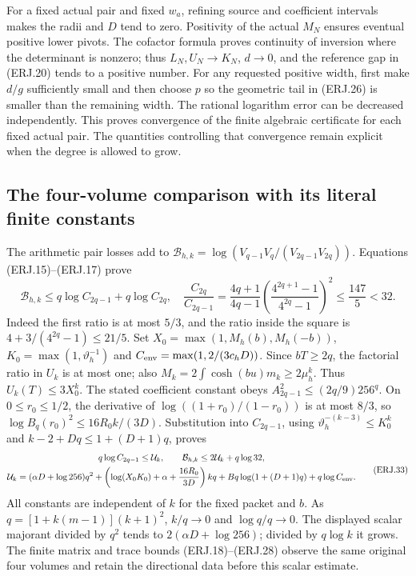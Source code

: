 For a fixed actual pair and fixed $w_a$, refining source and coefficient
intervals makes the radii and $D$ tend to zero. Positivity of the
actual $M_N$ ensures eventual positive lower pivots. The cofactor
formula proves continuity of inversion where the determinant is
nonzero; thus $L_N,U_N\to K_N$, $d\to0$, and the reference gap
in (ERJ.20) tends to a positive number. For any requested positive
width, first make $d/g$ sufficiently small and then choose $p$ so
the geometric tail in (ERJ.26) is smaller than the remaining width.
The rational logarithm error can be decreased independently. This
proves convergence of the finite algebraic certificate for each fixed
actual pair. The quantities controlling that convergence remain
explicit when the degree is allowed to grow.

\subsection{The four-volume comparison with its literal finite constants}
The arithmetic pair losses add to
$\mathcal B_{h,k}=\log(V_{q-1}V_q/(V_{2q-1}V_{2q}))$.
Equations (ERJ.15)--(ERJ.17) prove
\[
 \mathcal B_{h,k}\le q\log C_{2q-1}+q\log C_{2q},\quad
 \frac{C_{2q}}{C_{2q-1}}
 =\frac{4q+1}{4q-1}
 \left(\frac{4^{2q+1}-1}{4^{2q}-1}\right)^2
 \le\frac{147}{5}<32.\tag{ERJ.32}
\]
Indeed the first ratio is at most $5/3$, and the ratio inside
the square is $4+3/(4^{2q}-1)\le21/5$.
Set $X_0=\max(1,M_h(b),M_h(-b))$,
$K_0=\max(1,\vartheta_h^{-1})$ and
$C_{\rm env}=\max(1,2/(3c_hD))$. Since $bT\ge2q$,
the factorial ratio in $U_k$ is at most one; also
$M_k=2\int\cosh(bu)m_k\ge2\mu_h^k$. Thus $U_k(T)\le3X_0^k$.
The stated coefficient constant obeys
$A_{2q-1}^2\le(2q/9)256^q$. On $0\le r_0\le1/2$,
the derivative of $\log((1+r_0)/(1-r_0))$ is at most $8/3$,
so $\log B_q(r_0)^2\le16R_0k/(3D)$.
Substitution into $C_{2q-1}$, using
$\vartheta_h^{-(k-3)}\le K_0^k$ and
$k-2+Dq\le1+(D+1)q$, proves
\[
\begin{gathered}
 q\log C_{2q-1}\le\mathcal U_k,\qquad
 \mathcal B_{h,k}\le2\mathcal U_k+q\log32,\\
 \mathcal U_k=(\alpha D+\log256)q^2
 +\left(\log(X_0K_0)+\alpha+\frac{16R_0}{3D}\right)kq
 +Bq\log(1+(D+1)q)+q\log C_{\rm env}.
\end{gathered}\tag{ERJ.33}
\]
All constants are independent of $k$ for the fixed packet and $b$.
As $q=[1+k(m-1)](k+1)^2$, $k/q\to0$ and $\log q/q\to0$.
The displayed scalar majorant divided by $q^2$ tends to
$2(\alpha D+\log256)$; divided by $q\log k$ it grows.
The finite matrix and trace bounds (ERJ.18)--(ERJ.28) observe the
same original four volumes and retain the directional data before
this scalar estimate.

